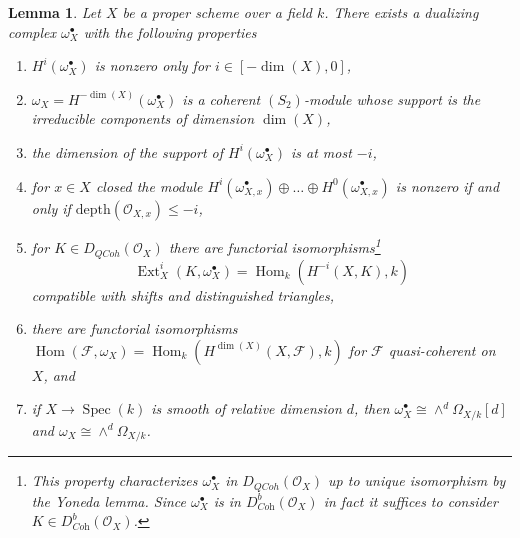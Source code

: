 \documentclass[10pt,a4paper]{amsart}
\theoremstyle{plain}
\newtheorem{lemma}[subsection]{Lemma}
\theoremstyle{definition}
\theoremstyle{remark}
\numberwithin{equation}{subsection}
\def\Spec{\mathop{\mathrm{Spec}}}
\def\Hom{\mathop{\mathrm{Hom}}\nolimits}
\def\Ext{\mathop{\mathrm{Ext}}\nolimits}
\def\QCoh{\mathit{QCoh}}
\begin{document}
\begin{lemma}
\label{lemma-duality-proper-over-field}
Let $X$ be a proper scheme over a field $k$. There exists a dualizing complex
$\omega_X^\bullet$ with the following properties
\begin{enumerate}
\item $H^i(\omega_X^\bullet)$ is nonzero only for $i \in [-\dim(X), 0]$,
\item $\omega_X = H^{-\dim(X)}(\omega_X^\bullet)$ is a coherent
$(S_2)$-module whose support is the irreducible components
of dimension $\dim(X)$,
\item the dimension of the support of $H^i(\omega_X^\bullet)$ is at most $-i$,
\item for $x \in X$ closed the module
$H^i(\omega_{X, x}^\bullet) \oplus \ldots \oplus H^0(\omega_{X, x}^\bullet)$
is nonzero if and only if $\text{depth}(\mathcal{O}_{X, x}) \leq -i$,
\item for $K \in D_\QCoh(\mathcal{O}_X)$ there are functorial
isomorphisms\footnote{This property
characterizes $\omega_X^\bullet$ in $D_\QCoh(\mathcal{O}_X)$
up to unique isomorphism by the Yoneda lemma. Since $\omega_X^\bullet$
is in $D^b_{\textit{Coh}}(\mathcal{O}_X)$ in fact it suffices to consider
$K \in D^b_{\textit{Coh}}(\mathcal{O}_X)$.}
$$
\Ext^i_X(K, \omega_X^\bullet) = \Hom_k(H^{-i}(X, K), k)
$$
compatible with shifts and distinguished triangles,
\item there are functorial isomorphisms
$\Hom(\mathcal{F}, \omega_X) = \Hom_k(H^{\dim(X)}(X, \mathcal{F}), k)$
for $\mathcal{F}$ quasi-coherent on $X$, and
\item if $X \to \Spec(k)$ is smooth of relative dimension $d$,
then $\omega_X^\bullet \cong \wedge^d\Omega_{X/k}[d]$ and
$\omega_X \cong \wedge^d\Omega_{X/k}$.
\end{enumerate}
\end{lemma}
\end{document}
